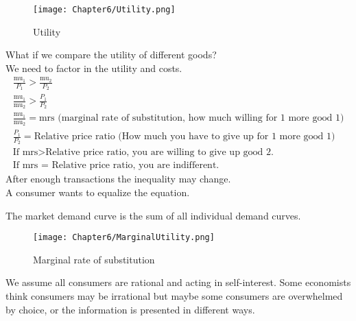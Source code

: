 \begin{figure}[H]
    \centering
    \texttt{[image: Chapter6/Utility.png]}
    \caption{Utility}
    \label{fig:Utility}
\end{figure}
What if we compare the utility of different goods?\\
We need to factor in the utility and costs.
\begin{equation}
    \begin{gathered}
        \frac{\text{mu}_1}{P_1} > \frac{\text{mu}_2}{P_2}\\
        \frac{\text{mu}_1}{\text{mu}_2} > \frac{P_1}{P_2}\\
        \frac{\text{mu}_1}{\text{mu}_2} = \text{mrs (marginal rate of substitution, how much willing for 1 more good 1)}\\
        \frac{P_1}{P_2} = \text{Relative price ratio (How much you have to give up for 1 more good 1)}\\
        \text{If mrs} > \text{Relative price ratio, you are willing to give up good 2.}\\
        \text{If mrs = Relative price ratio, you are indifferent.}
    \end{gathered}
\end{equation}
After enough transactions the inequality may change.\\
A consumer wants to equalize the equation.
\par
The market demand curve is the sum of all individual demand curves.
\begin{figure}[H]
    \centering
    \texttt{[image: Chapter6/MarginalUtility.png]}
    \caption{Marginal rate of substitution}
    \label{fig:Marginal_rate_of_substitution}
\end{figure}
\par
We assume all consumers are rational and acting in self-interest. Some economists think consumers may be irrational but maybe some consumers are overwhelmed by choice,
or the information is presented in different ways.